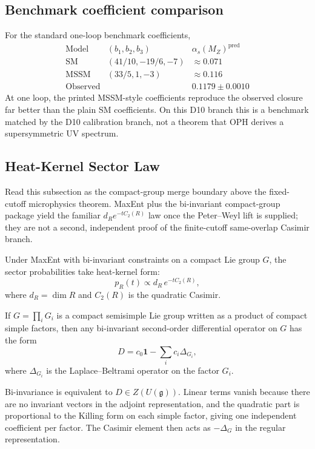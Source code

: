 \subsection{Benchmark coefficient comparison}

For the standard one-loop benchmark coefficients,
\[
\begin{array}{c|c|c}
\text{Model} & (b_1,b_2,b_3) & \alpha_s(M_Z)^{\mathrm{pred}} \\
\hline
\text{SM} & (41/10,-19/6,-7) & \approx 0.071 \\
\text{MSSM} & (33/5,1,-3) & \approx 0.116 \\
\text{Observed} & & 0.1179\pm 0.0010
\end{array}
\]
At one loop, the printed MSSM-style coefficients reproduce the observed closure far better than
the plain SM coefficients. On this D10 branch this is a benchmark matched by the D10
calibration branch, not a theorem that OPH derives a supersymmetric UV spectrum.

\subsection{Heat-Kernel Sector Law}

Read this subsection as the compact-group merge boundary above the fixed-cutoff microphysics
theorem. MaxEnt plus the bi-invariant compact-group package yield the familiar
\(d_R e^{-tC_2(R)}\) law once the Peter--Weyl lift is supplied; they are not a second,
independent proof of the finite-cutoff same-overlap Casimir branch.

\begin{theorem}
Under MaxEnt with bi-invariant constraints on a compact Lie group \(G\), the sector probabilities
take heat-kernel form:
\[
p_R(t)\propto d_R\,e^{-tC_2(R)},
\]
where \(d_R=\dim R\) and \(C_2(R)\) is the quadratic Casimir.
\end{theorem}

\begin{lemma}
If \(G=\prod_i G_i\) is a compact semisimple Lie group written as a product of compact simple
factors, then any bi-invariant second-order differential operator on \(G\) has the form
\[
D=c_0\mathbf 1-\sum_i c_i\Delta_{G_i},
\]
where \(\Delta_{G_i}\) is the Laplace--Beltrami operator on the factor \(G_i\).
\end{lemma}

\begin{remark}
Bi-invariance is equivalent to \(D\in Z(U(\mathfrak g))\). Linear terms vanish because there are
no invariant vectors in the adjoint representation, and the quadratic part is proportional to the
Killing form on each simple factor, giving one independent coefficient per factor. The Casimir
element then acts as \(-\Delta_G\) in the regular representation.
\end{remark}

